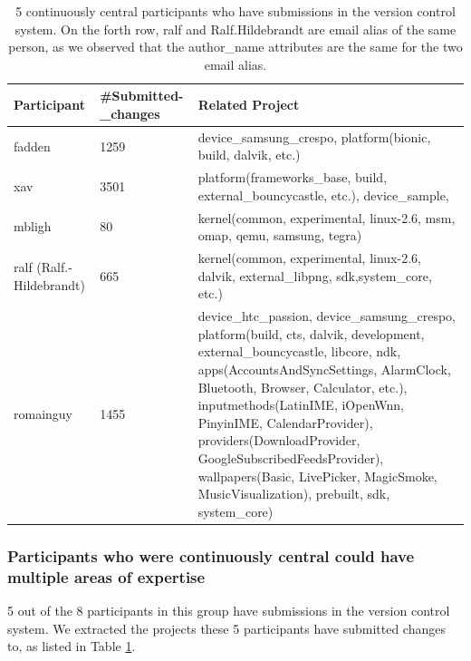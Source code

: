 \documentclass[10pt, conference, compsocconf]{IEEEtran}
\begin{document}
\begin{table}[!t]
\caption{5 continuously central participants who have submissions in the version control system. On the forth row, ralf and Ralf.Hildebrandt are email alias of the same person, as we observed that the author\_name attributes are the same for the two email alias.}
\label{continuous_project}
\centering
\begin{tabular}{|p{1.2cm}|p{1.1cm}|p{4.6cm}|}
\hline
Participant & \#Submitted-\_changes & Related Project \\
\hline
fadden & 1259 & device\_samsung\_crespo, platform(bionic, build, dalvik, etc.) \\
\hline
xav & 3501 & platform(frameworks\_base, build, external\_bouncycastle, etc.), device\_sample, \\
\hline
mbligh & 80 & kernel(common, experimental, linux-2.6, msm, omap, qemu, samsung, tegra) \\
\hline
ralf (Ralf.-Hildebrandt) & 665 & kernel(common, experimental, linux-2.6, dalvik, external\_libpng, sdk,system\_core, etc.) \\
\hline
romainguy & 1455 & device\_htc\_passion, device\_samsung\_crespo, platform(build, cts, dalvik, development, external\_bouncycastle, libcore, ndk, apps(AccountsAndSyncSettings, AlarmClock,
Bluetooth, Browser, Calculator, etc.),
inputmethods(LatinIME, iOpenWnn, PinyinIME, CalendarProvider),
providers(DownloadProvider, GoogleSubscribedFeedsProvider), wallpapers(Basic, LivePicker,
MagicSmoke, MusicVisualization), prebuilt, sdk, system\_core) \\
\hline
\end{tabular}
\end{table}


\subsubsection{Participants who were continuously central could have multiple areas of expertise}

5 out of the 8 participants in this group have submissions in the
version control system.
We extracted the projects these 5 participants have submitted changes
to, as listed in Table \ref{continuous_project}.
\end{document}
